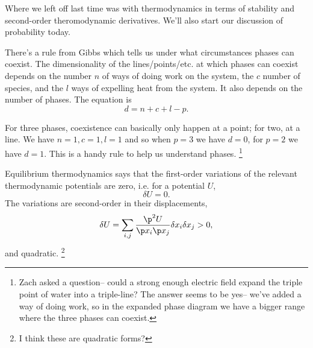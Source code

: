 Where we left off last time was with thermodynamics in terms of stability and second-order theromodynamic derivatives. We'll also start our discussion of probability today.

There's a rule from Gibbs which tells us under what circumstances phases can coexist. The dimensionality of the lines/points/etc. at which phases can coexist depends on the number $n$ of ways of doing work on the system, the $c$ number of species, and the $l$ ways of expelling heat from the system. It also depends on the number of phases. The equation is
\begin{equation}
    d = n+ c +l -p.
\end{equation}

For three phases, coexistence can basically only happen at a point; for two, at a line. We have $n=1,c=1,l=1$ and so when $p=3$ we have $d=0$, for $p=2$ we have $d=1$. This is a handy rule to help us understand phases.%
    \footnote{Zach asked a question-- could a strong enough electric field expand the triple point of water into a triple-line? The answer seems to be yes-- we've added a way of doing work, so in the expanded phase diagram we have a bigger range where the three phases can coexist.}
    
Equilibrium thermodynamics says that the first-order variations of the relevant thermodynamic potentials are zero, i.e. for a potential $U$,
\begin{equation}
    \delta U=0.
\end{equation}
The variations are second-order in their displacements,
\begin{equation}
    \delta U = \sum_{i,j} \frac{\p^2 U}{\p x_i \p x_j}\delta x_i \delta x_j >0,
\end{equation}
and quadratic.%
    \footnote{I think these are quadratic forms?}

